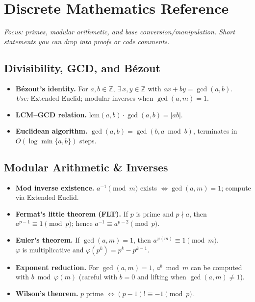 \documentclass[10pt]{article}
\theoremstyle{definition}
\begin{document}
\clearpage

\section{Discrete Mathematics Reference}\label{app:discrete}
\textit{Focus: primes, modular arithmetic, and base conversion/manipulation. Short statements you can drop into proofs or code comments.}

\subsection{Divisibility, GCD, and Bézout}
\begin{itemize}
  \item \textbf{Bézout's identity.} For $a,b\in\mathbb{Z}$, $\exists\,x,y\in\mathbb{Z}$ with $ax+by=\gcd(a,b)$. \\
        \emph{Use:} Extended Euclid; modular inverses when $\gcd(a,m)=1$.
  \item \textbf{LCM--GCD relation.} $\mathrm{lcm}(a,b)\cdot \gcd(a,b)=|ab|$.
  \item \textbf{Euclidean algorithm.} $\gcd(a,b)=\gcd(b,a\bmod b)$, terminates in $O(\log\min\{a,b\})$ steps.
\end{itemize}

\subsection{Modular Arithmetic \& Inverses}
\begin{itemize}
  \item \textbf{Mod inverse existence.} $a^{-1}\pmod m$ exists $\iff \gcd(a,m)=1$; compute via Extended Euclid.
  \item \textbf{Fermat's little theorem (FLT).} If $p$ is prime and $p\nmid a$, then $a^{p-1}\equiv 1\pmod p$; hence $a^{-1}\equiv a^{p-2}\pmod p$.
  \item \textbf{Euler's theorem.} If $\gcd(a,m)=1$, then $a^{\varphi(m)}\equiv 1\pmod m$. \\
        $\varphi$ is multiplicative and $\varphi(p^k)=p^k-p^{k-1}$.
  \item \textbf{Exponent reduction.} For $\gcd(a,m)=1$, $a^b\bmod m$ can be computed with $b\bmod \varphi(m)$ (careful with $b=0$ and lifting when $\gcd(a,m)\ne 1$).
  \item \textbf{Wilson's theorem.} $p$ prime $\iff (p-1)!\equiv -1\pmod p$.
\end{itemize}
\end{document}
